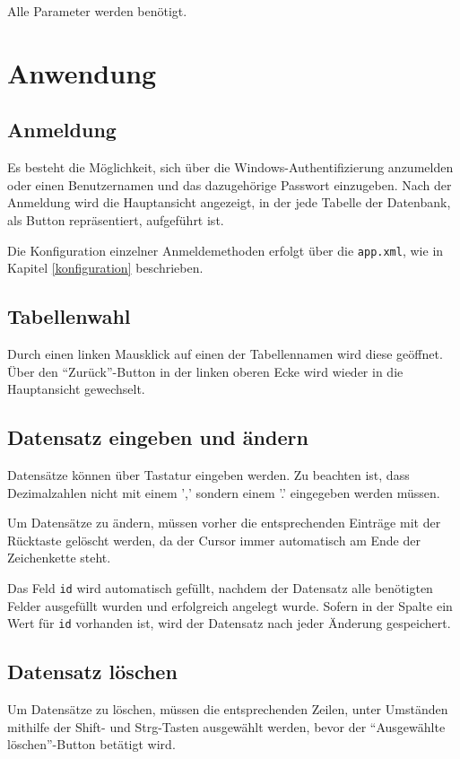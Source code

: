 			Alle Parameter werden benötigt.

\chapter{Anwendung}
	\section{Anmeldung}
		Es besteht die Möglichkeit, sich über die Windows-Authentifizierung anzumelden
		oder einen Benutzernamen und das dazugehörige Passwort einzugeben.
		Nach der Anmeldung wird die Hauptansicht angezeigt, in der jede Tabelle der
		Datenbank, als Button repräsentiert, aufgeführt ist.
		
		Die Konfiguration einzelner Anmeldemethoden erfolgt über die \texttt{app.xml},
		wie in Kapitel \ref{konfiguration} beschrieben.
		
	\section{Tabellenwahl}
		Durch einen linken Mausklick auf einen der Tabellennamen wird diese geöffnet.
		Über den "`Zurück"'-Button in der linken oberen Ecke wird wieder in die
		Hauptansicht gewechselt.
		
	\section{Datensatz eingeben und ändern}
		Datensätze können über Tastatur eingeben werden. Zu beachten ist, dass
		Dezimalzahlen nicht mit einem ',' sondern einem '.' eingegeben werden müssen.
		
		Um Datensätze zu ändern, müssen vorher die entsprechenden Einträge mit der
		Rücktaste gelöscht werden, da der Cursor immer automatisch am Ende der
		Zeichenkette steht.
		
		Das Feld \texttt{id} wird automatisch gefüllt, nachdem der Datensatz
		alle benötigten Felder ausgefüllt wurden und erfolgreich angelegt wurde.
		Sofern in der Spalte ein Wert für \texttt{id} vorhanden ist, wird der
		Datensatz nach jeder Änderung gespeichert.
		
	\section{Datensatz löschen}
		Um Datensätze zu löschen, müssen die entsprechenden Zeilen, unter Umständen
		mithilfe der Shift- und Strg-Tasten ausgewählt werden, bevor der "`Ausgewählte
		löschen"'-Button betätigt wird.
		
